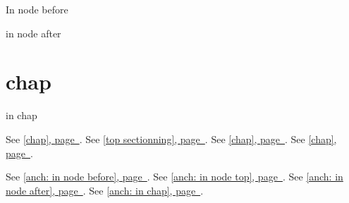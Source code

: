 \documentclass{book}
\begin{document}
\label{anchor:node-before}%

In node before
\label{anchor:anch_003a-in-node-before}%

\label{anchor:after}%

in node after
\label{anchor:anch_003a-in-node-after}%

\chapter{chap}
\label{anchor:chap}%

in chap
\label{anchor:anch_003a-in-chap}%

See \hyperref[anchor:anch_003a-in-node-before]{[chap], page~\pageref*{anchor:anch_003a-in-node-before}}.
See \hyperref[anchor:anch_003a-in-node-top]{[top sectionning], page~\pageref*{anchor:anch_003a-in-node-top}}.
See \hyperref[anchor:anch_003a-in-node-after]{[chap], page~\pageref*{anchor:anch_003a-in-node-after}}.
See \hyperref[anchor:anch_003a-in-chap]{[chap], page~\pageref*{anchor:anch_003a-in-chap}}.

See \hyperref[anchor:anch_003a-in-node-before]{[anch: in node before], page~\pageref*{anchor:anch_003a-in-node-before}}.
See \hyperref[anchor:anch_003a-in-node-top]{[anch: in node top], page~\pageref*{anchor:anch_003a-in-node-top}}.
See \hyperref[anchor:anch_003a-in-node-after]{[anch: in node after], page~\pageref*{anchor:anch_003a-in-node-after}}.
See \hyperref[anchor:anch_003a-in-chap]{[anch: in chap], page~\pageref*{anchor:anch_003a-in-chap}}.
\end{document}
